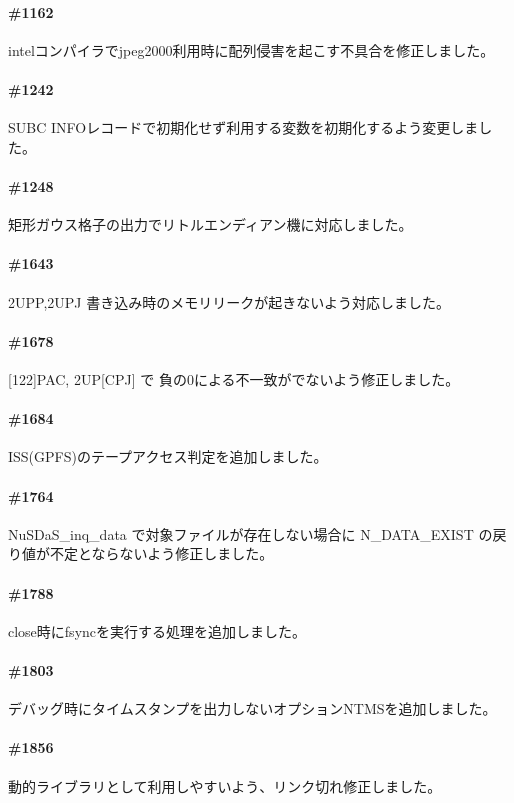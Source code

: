\paragraph{\#1162}
intelコンパイラでjpeg2000利用時に配列侵害を起こす不具合を修正しました。

\paragraph{\#1242}
SUBC INFOレコードで初期化せず利用する変数を初期化するよう変更しました。

\paragraph{\#1248}
矩形ガウス格子の出力でリトルエンディアン機に対応しました。

\paragraph{\#1643}
2UPP,2UPJ 書き込み時のメモリリークが起きないよう対応しました。

\paragraph{\#1678}
[122]PAC, 2UP[CPJ] で 負の0による不一致がでないよう修正しました。

\paragraph{\#1684}
ISS(GPFS)のテープアクセス判定を追加しました。

\paragraph{\#1764}
NuSDaS\_inq\_data で対象ファイルが存在しない場合に N\_DATA\_EXIST の戻り値が不定とならないよう修正しました。

\paragraph{\#1788}
close時にfsyncを実行する処理を追加しました。

\paragraph{\#1803}
デバッグ時にタイムスタンプを出力しないオプションNTMSを追加しました。

\paragraph{\#1856}
動的ライブラリとして利用しやすいよう、リンク切れ修正しました。

